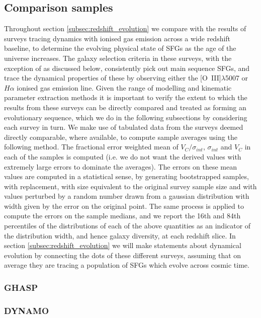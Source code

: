 \documentclass[fleqn,usenatbib]{mn2e}
\begin{document}
\subsection{Comparison samples}\label{subsubsec:comparison_samples}
Throughout section \cref{subsec:redshift_evolution} we compare with the results of surveys tracing dynamics with ionised gas emission across a wide redshift baseline, to determine the evolving physical state of SFGs as the age of the universe increases.
The galaxy selection criteria in these surveys, with the exception of \cite{Green2014} as discussed below, consistently pick out main sequence SFGs, and trace the dynamical properties of these by observing either the [O~{\sc III}]$\lambda$5007 or $H\alpha$ ionised gas emission line.
Given the range of modelling and kinematic parameter extraction methods it is important to verify the extent to which the results from these surveys can be directly compared and treated as forming an evolutionary sequence, which we do in the following subsections by considering each survey in turn.
We make use of tabulated data from the surveys deemed directly comparable, where available, to compute sample averages using the following method. 
The fractional error weighted mean of $V_{C}/\sigma_{int}$, $\sigma_{int}$ and $V_{C}$ in each of the samples is computed (i.e. we do not want the derived values with extremely large errors to dominate the averages).
The errors on these mean values are computed in a statistical sense, by generating bootstrapped samples, with replacement, with size equivalent to the original survey sample size and with values perturbed by a random number drawn from a gaussian distribution with width given by the error on the original point.
The same process is applied to compute the errors on the sample medians, and we report the 16th and 84th percentiles of the distributions of each of the above quantities as an indicator of the distribution width, and hence galaxy diversity, at each redshift slice.
In section \cref{subsec:redshift_evolution} we will make statements about dynamical evolution by connecting the dots of these different surveys, assuming that on average they are tracing a population of SFGs which evolve across cosmic time. 


\subsubsection{GHASP}\label{subsubsec:GHASP}

\subsubsection{DYNAMO}\label{subsubsec:DYNAMO}
\end{document}
